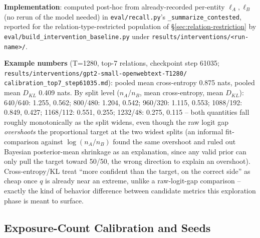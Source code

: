 \documentclass[11pt]{article}
\begin{document}
\textbf{Implementation}: computed post-hoc from already-recorded per-entity
$\ell_A, \ell_B$ (no rerun of the model needed) in \texttt{eval/recall.py}'s
\texttt{\_summarize\_contested}, reported for the relation-type-restricted
population of \S\ref{sec:relation-restriction} by
\texttt{eval/build\_intervention\_baseline.py} under
\texttt{results/interventions/<run-name>/}.

\textbf{Example numbers} (T=1280, top-7 relations, checkpoint step 61035;
\texttt{results/interventions/gpt2-small-openwebtext-T1280/
calibration\_top7\_step61035.md}): pooled mean cross-entropy 0.875 nats,
pooled mean $D_{KL}$ 0.409 nats. By split level ($n_A$/$n_B$, mean
cross-entropy, mean $D_{KL}$): 640/640: 1.255, 0.562; 800/480: 1.204, 0.542;
960/320: 1.115, 0.553; 1088/192: 0.849, 0.427; 1168/112: 0.551, 0.255;
1232/48: 0.275, 0.115 -- both quantities fall roughly monotonically as the
split widens, even though the raw logit gap \emph{overshoots} the
proportional target at the two widest splits (an informal fit-comparison
against $\log(n_A/n_B)$ found the same overshoot and ruled out Bayesian
posterior-mean shrinkage as an explanation, since any valid prior can only
pull the target toward 50/50, the wrong direction to explain an overshoot).
Cross-entropy/KL treat ``more confident than the target, on the correct
side'' as cheap once $q$ is already near an extreme, unlike a raw-logit-gap
comparison -- exactly the kind of behavior difference between candidate
metrics this exploration phase is meant to surface.

\subsection{Exposure-Count Calibration and Seeds}
\label{sec:seeds}
\end{document}
